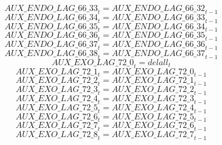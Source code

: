 \begin{dmath}
{AUX\_ENDO\_LAG\_66\_33}_{t}={AUX\_ENDO\_LAG\_66\_32}_{t-1}
\end{dmath}
\begin{dmath}
{AUX\_ENDO\_LAG\_66\_34}_{t}={AUX\_ENDO\_LAG\_66\_33}_{t-1}
\end{dmath}
\begin{dmath}
{AUX\_ENDO\_LAG\_66\_35}_{t}={AUX\_ENDO\_LAG\_66\_34}_{t-1}
\end{dmath}
\begin{dmath}
{AUX\_ENDO\_LAG\_66\_36}_{t}={AUX\_ENDO\_LAG\_66\_35}_{t-1}
\end{dmath}
\begin{dmath}
{AUX\_ENDO\_LAG\_66\_37}_{t}={AUX\_ENDO\_LAG\_66\_36}_{t-1}
\end{dmath}
\begin{dmath}
{AUX\_ENDO\_LAG\_66\_38}_{t}={AUX\_ENDO\_LAG\_66\_37}_{t-1}
\end{dmath}
\begin{dmath}
{AUX\_EXO\_LAG\_72\_0}_{t}={delall}_{t}
\end{dmath}
\begin{dmath}
{AUX\_EXO\_LAG\_72\_1}_{t}={AUX\_EXO\_LAG\_72\_0}_{t-1}
\end{dmath}
\begin{dmath}
{AUX\_EXO\_LAG\_72\_2}_{t}={AUX\_EXO\_LAG\_72\_1}_{t-1}
\end{dmath}
\begin{dmath}
{AUX\_EXO\_LAG\_72\_3}_{t}={AUX\_EXO\_LAG\_72\_2}_{t-1}
\end{dmath}
\begin{dmath}
{AUX\_EXO\_LAG\_72\_4}_{t}={AUX\_EXO\_LAG\_72\_3}_{t-1}
\end{dmath}
\begin{dmath}
{AUX\_EXO\_LAG\_72\_5}_{t}={AUX\_EXO\_LAG\_72\_4}_{t-1}
\end{dmath}
\begin{dmath}
{AUX\_EXO\_LAG\_72\_6}_{t}={AUX\_EXO\_LAG\_72\_5}_{t-1}
\end{dmath}
\begin{dmath}
{AUX\_EXO\_LAG\_72\_7}_{t}={AUX\_EXO\_LAG\_72\_6}_{t-1}
\end{dmath}
\begin{dmath}
{AUX\_EXO\_LAG\_72\_8}_{t}={AUX\_EXO\_LAG\_72\_7}_{t-1}
\end{dmath}
